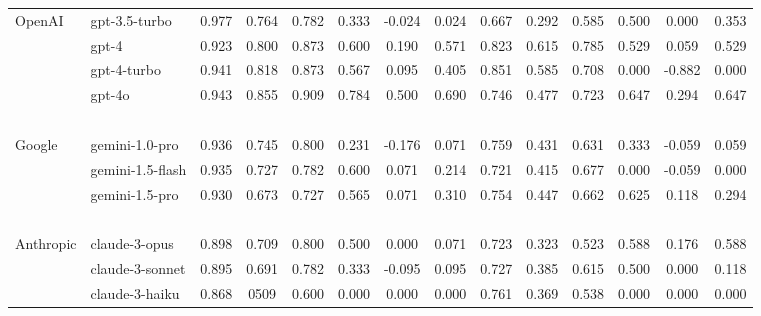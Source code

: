 \begin{table*}[ht]
\begin{tabular}{l|lccc|ccc|ccc|ccc}
        \hline
        OpenAI  & gpt-3.5-turbo          & 0.977 & 0.764 & 0.782 & 0.333 & -0.024 & 0.024 & 0.667 & 0.292 & 0.585 & 0.500 & 0.000 & 0.353 \\ %
        ~       & gpt-4                  & 0.923 & 0.800 & 0.873 & 0.600 & 0.190 & 0.571 & 0.823 & 0.615 & 0.785 & 0.529 & 0.059 & 0.529  \\ %
        ~       & gpt-4-turbo            & 0.941 & 0.818 & 0.873 & 0.567 & 0.095 & 0.405 & 0.851 & 0.585 & 0.708 & 0.000 & -0.882 & 0.000  \\ %
        ~       & gpt-4o                 & 0.943 & 0.855 & 0.909 & 0.784 & 0.500 & 0.690 & 0.746 & 0.477 & 0.723 & 0.647 & 0.294 & 0.647  \\ %
        ~       & ~                      & ~ & ~ & ~ & ~   & ~ & ~ & ~ & ~ & ~ & ~ & ~ & ~ \\
        Google  & gemini-1.0-pro         & 0.936 & 0.745 & 0.800 & 0.231   & -0.176 & 0.071 & 0.759 & 0.431 & 0.631 & 0.333 & -0.059 & 0.059\\ %
        ~       & gemini-1.5-flash       & 0.935 & 0.727 & 0.782 & 0.600   & 0.071 & 0.214 & 0.721 & 0.415 & 0.677 & 0.000 & -0.059 & 0.000\\ %
        ~       & gemini-1.5-pro         & 0.930 & 0.673 & 0.727 & 0.565   & 0.071 & 0.310 & 0.754 & 0.447 & 0.662 & 0.625 & 0.118 & 0.294\\ %
        ~       & ~                      & ~ & ~ & ~ & ~   & ~ & ~ & ~ & ~ & ~ & ~ & ~ & ~ \\
        Anthropic & claude-3-opus        & 0.898 & 0.709 & 0.800 & 0.500   & 0.000 & 0.071 & 0.723 & 0.323 & 0.523 & 0.588 & 0.176 & 0.588\\ %
        ~       & claude-3-sonnet        & 0.895 & 0.691 & 0.782 & 0.333   & -0.095 & 0.095 & 0.727 & 0.385 & 0.615 & 0.500 & 0.000 & 0.118\\ %
        ~       & claude-3-haiku         & 0.868 & 0509 & 0.600 & 0.000   & 0.000 & 0.000 & 0.761 & 0.369 & 0.538 & 0.000 & 0.000 & 0.000\\ %

\end{tabular}
\end{table*}
